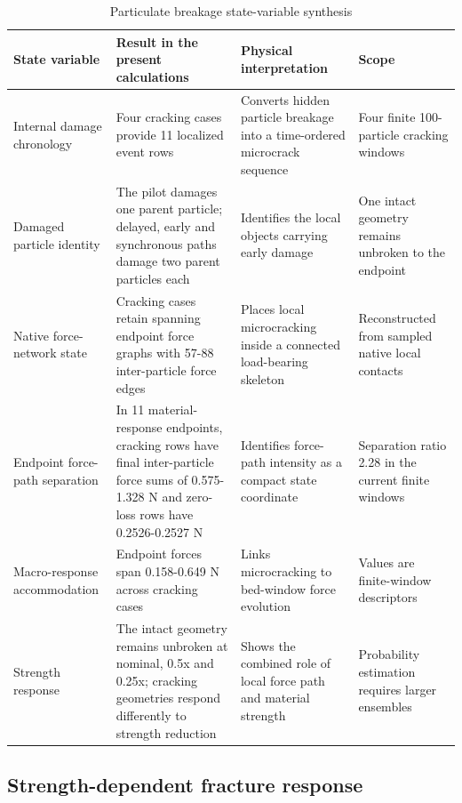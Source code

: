 \documentclass[preprint,12pt]{elsarticle}
\begin{document}
\begin{table}[!t]
\centering
\caption{Particulate breakage state-variable synthesis}
\label{tab:state-variables}
\scriptsize
\setlength{\tabcolsep}{2.2pt}
\renewcommand{\arraystretch}{1.12}
\begin{tabularx}{0.98\textwidth}{>{\raggedright\arraybackslash}p{}>{\raggedright\arraybackslash}p{}>{\raggedright\arraybackslash}p{}>{\raggedright\arraybackslash}X}
\toprule
State variable & Result in the present calculations & Physical interpretation & Scope \\
\midrule
Internal damage chronology & Four cracking cases provide 11 localized event rows & Converts hidden particle breakage into a time-ordered microcrack sequence & Four finite 100-particle cracking windows \\
Damaged particle identity & The pilot damages one parent particle; delayed, early and synchronous paths damage two parent particles each & Identifies the local objects carrying early damage & One intact geometry remains unbroken to the endpoint \\
Native force-network state & Cracking cases retain spanning endpoint force graphs with 57-88 inter-particle force edges & Places local microcracking inside a connected load-bearing skeleton & Reconstructed from sampled native local contacts \\
Endpoint force-path separation & In 11 material-response endpoints, cracking rows have final inter-particle force sums of 0.575-1.328 N and zero-loss rows have 0.2526-0.2527 N & Identifies force-path intensity as a compact state coordinate & Separation ratio 2.28 in the current finite windows \\
Macro-response accommodation & Endpoint forces span 0.158-0.649 N across cracking cases & Links microcracking to bed-window force evolution & Values are finite-window descriptors \\
Strength response & The intact geometry remains unbroken at nominal, 0.5x and 0.25x; cracking geometries respond differently to strength reduction & Shows the combined role of local force path and material strength & Probability estimation requires larger ensembles \\
\bottomrule
\end{tabularx}
\end{table}


\subsection{Strength-dependent fracture response}
\end{document}
